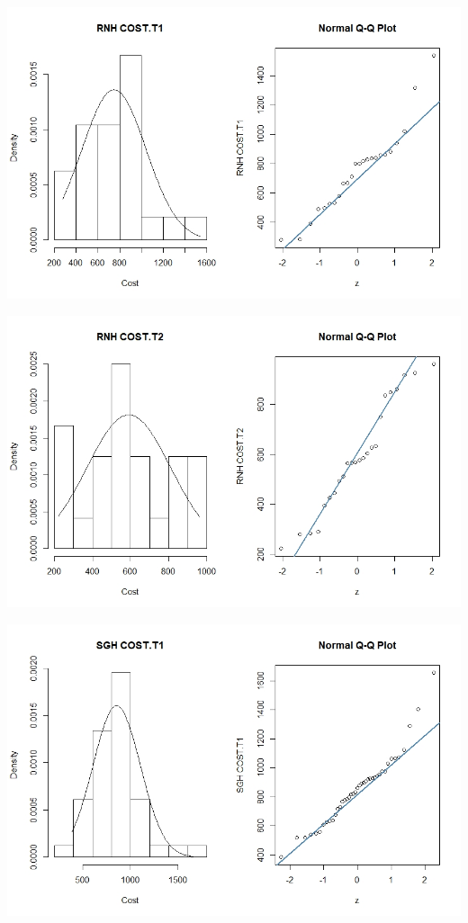 \documentclass[]{article}
\begin{document}
\centering
\includegraphics[width=\textwidth]{RStudio/jpeg/Norm_RNH_T1.jpeg}
\raggedright


\centering
\includegraphics[width=\textwidth]{RStudio/jpeg/Norm_RNH_T2.jpeg}
\raggedright


\centering
\includegraphics[width=\textwidth]{RStudio/jpeg/Norm_SGH_T1.jpeg}
\raggedright
\end{document}
